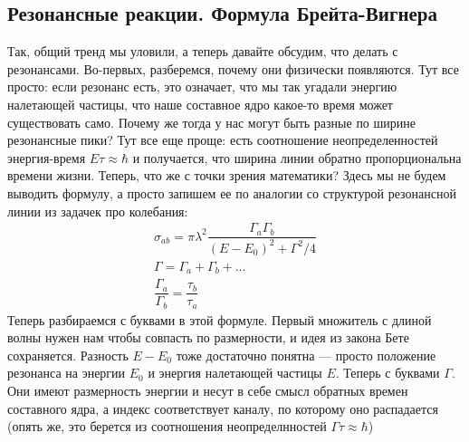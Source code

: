 \documentclass[12pt]{article}
\begin{document}
\subsection{Резонансные реакции. Формула Брейта-Вигнера}
Так, общий тренд мы уловили, а теперь давайте обсудим, что делать с резонансами. Во-первых, разберемся, почему они физически появляются. Тут все просто: если резонанс есть, это означает, что мы так угадали энергию налетающей частицы, что наше составное ядро какое-то время может существовать само. Почему же тогда у нас могут быть разные по ширине резонансные пики? Тут все еще проще: есть соотношение неопределенностей энергия-время $E\tau \approx \hbar$ и получается, что ширина линии обратно пропорциональна времени жизни. Теперь, что же с точки зрения математики? Здесь мы не будем выводить формулу, а просто запишем ее по аналогии со структурой резонансной линии из задачек про колебания:
\begin{gather*}
    \sigma_{ab} = \pi \lambda^2 \dfrac{\Gamma_a \Gamma_b}{(E-E_0)^2 + \Gamma^2/4}\\
    \Gamma = \Gamma_a + \Gamma_b + \dots\\
    \dfrac{\Gamma_a}{\Gamma_b}=\dfrac{\tau_b}{\tau_a}
\end{gather*}
Теперь разбираемся с буквами в этой формуле. Первый множитель с длиной волны нужен нам чтобы совпасть по размерности, и идея из закона Бете сохраняется. Разность $E-E_0$ тоже достаточно понятна --- просто положение резонанса на энергии $E_0$ и энергия налетающей частицы $E$. Теперь с буквами $\Gamma$. Они имеют размерность энергии и несут в себе смысл обратных времен составного ядра, а индекс соответствует каналу, по которому оно распадается (опять же, это берется из соотношения неопределнностей $\Gamma \tau \approx \hbar$) 
\end{document}
